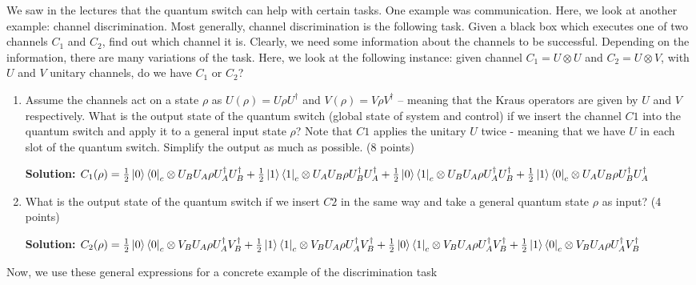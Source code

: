 \documentclass[12pt]{article}
\begin{document}
We saw in the lectures that the quantum switch can help with certain tasks. One example was communication. Here,
we look at another example: channel discrimination. Most generally, channel discrimination is the following task.
Given a black box which executes one of two channels $C_1$ and $C_2$, find out which channel it is. Clearly, we need some
information about the channels to be successful. Depending on the information, there are many variations of the task.
Here, we look at the following instance: given channel $C_1 = U \otimes U$ and $C_2 = U \otimes V$, with $U$ and $V$ unitary channels,
do we have $C_1$ or $C_2$?
\begin{enumerate}[start=2]
    \item Assume the channels act on a state $\rho$ as $U(\rho) = U\rho U^\dagger$ and $V(\rho) = V \rho V^\dagger$ – meaning that the Kraus operators are given by $U$ and $V$ respectively. What is the output state of the quantum switch (global state of system and control) if we insert the channel $C1$ into the quantum switch and apply it to a general input state $\rho$? Note that $C1$ applies the unitary $U$ twice - meaning that we have $U$ in each slot of the quantum switch. Simplify the output as much as possible. (8 points)
    

        
\textbf{Solution:}
$C_1(\rho)=\frac{1}{2}\ket{0}\bra{0}_c\otimes U_B U_A\rho U_A^{\dagger} U_B^{\dagger}
+\frac{1}{2}\ket{1}\bra{1}_c\otimes U_A U_B\rho U_B^{\dagger} U_A^{\dagger}
+\frac{1}{2}\ket{0}\bra{1}_c\otimes U_B U_A\rho U_A^{\dagger} U_B^{\dagger}
+\frac{1}{2}\ket{1}\bra{0}_c\otimes U_A U_B\rho U_B^{\dagger} U_A^{\dagger}
$




    \item What is the output state of the quantum switch if we insert $C2$ in the same way and take a general quantum state $\rho$ as input? (4 points)

    \textbf{Solution:}
$C_2(\rho)=\frac{1}{2}\ket{0}\bra{0}_c\otimes V_B U_A\rho U_A^{\dagger} V_B^{\dagger}
+\frac{1}{2}\ket{1}\bra{1}_c\otimes V_B U_A \rho U_A^{\dagger} V_B^{\dagger}
+\frac{1}{2}\ket{0}\bra{1}_c\otimes V_B U_A\rho U_A^{\dagger} V_B^{\dagger}
+\frac{1}{2}\ket{1}\bra{0}_c\otimes V_B U_A\rho U_A^{\dagger} V_B^{\dagger}
$





\end{enumerate}
Now, we use these general expressions for a concrete example of the discrimination task
\end{document}
